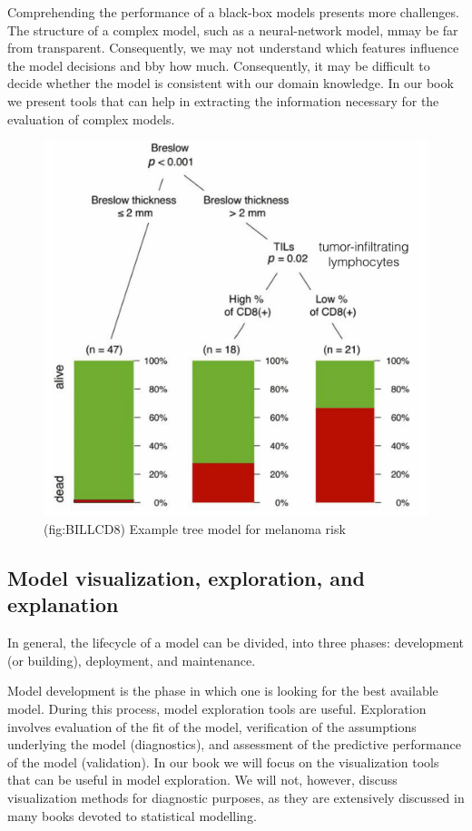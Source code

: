 \documentclass[12pt,]{krantz}
\begin{document}
Comprehending the performance of a black-box models presents more challenges. The structure of a complex model, such as a neural-network model, mmay be far from transparent. Consequently, we may not understand which features influence the model decisions and bby how much. Consequently, it may be difficult to decide whether the model is consistent with our domain knowledge. In our book we present tools that can help in extracting the information necessary for the evaluation of complex models.

\begin{figure}

{\centering \includegraphics[width=0.5\linewidth]{figure/wbBILL8model} 

}

\caption{(fig:BILLCD8) Example tree model for melanoma risk}\label{fig:BILLCD8}
\end{figure}

\hypertarget{model-visualization-exploration-and-explanation}{%
\subsection{Model visualization, exploration, and explanation}\label{model-visualization-exploration-and-explanation}}

In general, the lifecycle of a model can be divided, into three phases: development (or building), deployment, and maintenance.

Model development is the phase in which one is looking for the best available model. During this process, model exploration tools are useful. Exploration involves evaluation of the fit of the model, verification of the assumptions underlying the model (diagnostics), and assessment of the predictive performance of the model (validation). In our book we will focus on the visualization tools that can be useful in model exploration. We will not, however, discuss visualization methods for diagnostic purposes, as they are extensively discussed in many books devoted to statistical modelling.
\end{document}
